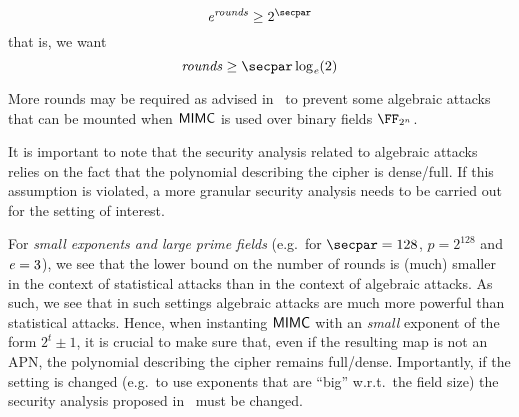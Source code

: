 \[
    \exponent{}^{\rounds} \geq 2^{\secpar}
\]
that is, we want
\[
    \rounds \geq \secpar \log_{\exponent}(2)
\]

\begin{remark}
    More rounds may be required as advised in~\cite{DBLP:conf/asiacrypt/Eichlseder0LORS20} to prevent some algebraic attacks that can be mounted when $\mathsf{MIMC{}}$ is used over binary fields $\FFx{2^n}$.
\end{remark}

It is important to note that the security analysis related to algebraic attacks relies on the fact that the polynomial describing the cipher is dense/full. If this assumption is violated, a more granular security analysis needs to be carried out for the setting of interest.

\begin{notebox}
    For \emph{small exponents and large prime fields} (e.g.~for $\secpar = 128$, $p = 2^{128}$ and $\mathit{e}{} = 3$), we see that the lower bound on the number of rounds is (much) smaller in the context of statistical attacks than in the context of algebraic attacks. As such, we see that in such settings algebraic attacks are much more powerful than statistical attacks. Hence, when instanting $\mathsf{MIMC{}}$ with an \emph{small} exponent of the form $2^t \pm 1$, it is crucial to make sure that, even if the resulting map is not an APN, the polynomial describing the cipher remains full/dense. Importantly, if the setting is changed (e.g.~to use exponents that are ``big'' w.r.t.~the field size) the security analysis proposed in~\cite{albrecht2016mimc} must be changed.
\end{notebox}